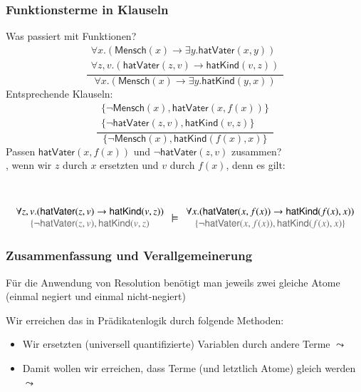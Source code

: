 \documentclass[onlymath]{beamer}
\begin{document}
\begin{frame}\frametitle{Funktionsterme in Klauseln}

Was passiert mit Funktionen?
%
\[ \frac{
\begin{array}{c}
\forall x.(\textsf{Mensch}(x)\to\exists y.\textsf{hatVater}(x,y))\\
\forall z,v.(\textsf{hatVater}(z,v)\to\textsf{hatKind}(v,z))
\end{array}
}
{
\forall x.(\textsf{Mensch}(x)\to\exists y.\textsf{hatKind}(y,x))
}
\]
%
Entsprechende Klauseln:
\[ \frac{
\begin{array}{c}
\{\neg\textsf{Mensch}(x),\textsf{hatVater}(x,f(x))\}\\
\{\neg\textsf{hatVater}(z,v),\textsf{hatKind}(v,z)\}
\end{array}
}
{
\{\neg\textsf{Mensch}(x),\textsf{hatKind}(f(x),x)\}
}
\]
Passen $\textsf{hatVater}(x,f(x))$ und $\neg\textsf{hatVater}(z,v)$ zusammen?\\\pause
{}, wenn wir $z$ durch $x$ ersetzten und $v$ durch $f(x)$, denn es gilt:

~\hspace{-1cm}%
\begin{minipage}{8cm}
\footnotesize
\[\begin{array}{c}
\forall z,v.(\textsf{hatVater}(z,v)\to\textsf{hatKind}(v,z))\\
{\color{devilscss}\{\neg\textsf{hatVater}(z,v),\textsf{hatKind}(v,z)}
\end{array}
\models
\begin{array}{c}
\forall x.(\textsf{hatVater}(x,f(x))\to\textsf{hatKind}(f(x),x))\\
{\color{devilscss}\{\neg\textsf{hatVater}(x,f(x)),\textsf{hatKind}(f(x),x)\}}
\end{array}
\]
\end{minipage}

\end{frame}

\begin{frame}\frametitle{Zusammenfassung und Verallgemeinerung}

Für die Anwendung von Resolution benötigt man jeweils zwei gleiche Atome\\ (einmal negiert und einmal nicht-negiert)\medskip

Wir erreichen das in Prädikatenlogik durch folgende Methoden:
\begin{itemize}
\item Wir ersetzten (universell quantifizierte) Variablen durch andere Terme $\leadsto$~
\item Damit wollen wir erreichen, dass Terme (und letztlich Atome) gleich werden $\leadsto$~
\end{itemize}

\end{frame}
\end{document}
